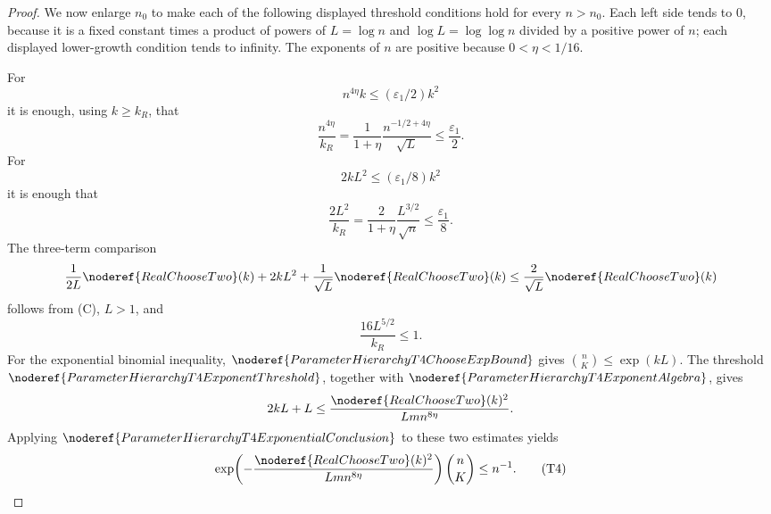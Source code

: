 \begin{proof}
We now enlarge \(n_0\) to make each of the following displayed threshold
conditions hold for every \(n>n_0\).  Each left side tends to \(0\), because
it is a fixed constant times a product of powers of \(L=\log n\) and
\(\log L=\log\log n\) divided by a positive power of \(n\); each displayed
lower-growth condition tends to infinity.  The exponents of \(n\) are positive
because \(0<\eta<1/16\).

For
\[
n^{4\eta}k\le(\varepsilon_1/2)k^2
\]
it is enough, using \(k\ge k_R\), that
\[
\frac{n^{4\eta}}{k_R}
=\frac{1}{1+\eta}\frac{n^{-1/2+4\eta}}{\sqrt L}
\le\frac{\varepsilon_1}{2}. \tag{T1}
\]
For
\[
2kL^2\le(\varepsilon_1/8)k^2
\]
it is enough that
\[
\frac{2L^2}{k_R}
=\frac{2}{1+\eta}\frac{L^{3/2}}{\sqrt n}
\le\frac{\varepsilon_1}{8}. \tag{T2}
\]
The three-term comparison
\[
\frac1{2L}\noderef{RealChooseTwo}(k)+2kL^2+
\frac1{\sqrt L}\noderef{RealChooseTwo}(k)
\le\frac2{\sqrt L}\noderef{RealChooseTwo}(k)
\]
follows from (C), \(L>1\), and
\[
\frac{16L^{5/2}}{k_R}\le1. \tag{T3}
\]
For the exponential binomial inequality,
\(\noderef{ParameterHierarchyT4ChooseExpBound}\) gives
\(\binom nK\le\exp(kL)\).  The threshold
\(\noderef{ParameterHierarchyT4ExponentThreshold}\), together with
\(\noderef{ParameterHierarchyT4ExponentAlgebra}\), gives
\[
2kL+L\le
\frac{\noderef{RealChooseTwo}(k)^2}{Lm n^{8\eta}}.
\]
Applying \(\noderef{ParameterHierarchyT4ExponentialConclusion}\) to these
two estimates yields
\[
\exp\!\left(
-\frac{\noderef{RealChooseTwo}(k)^2}{Lm n^{8\eta}}
\right)\binom nK\le n^{-1}. \tag{T4}
\]


\end{proof}

